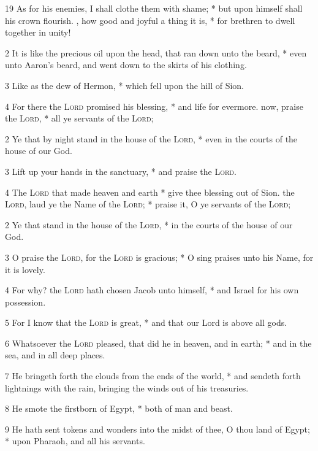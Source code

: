 19 As for his enemies, I shall clothe them with shame; * but upon himself shall his crown flourish.
, how good and joyful a thing it is, * for brethren to dwell together in unity!\par
2 It is like the precious oil upon the head, that ran down unto the beard, * even unto Aaron's beard, and went down to the skirts of his clothing.\par
3 Like as the dew of Hermon, * which fell upon the hill of Sion.\par
4 For there the {\textsc{Lord}} promised his blessing, * and life for evermore.
 now, praise the {\textsc{Lord}}, * all ye servants of the {\textsc{Lord}};\par
2 Ye that by night stand in the house of the {\textsc{Lord}}, * even in the courts of the house of our God.\par
3 Lift up your hands in the sanctuary, * and praise the {\textsc{Lord}}.\par
4 The {\textsc{Lord}} that made heaven and earth * give thee blessing out of Sion.
 the {\textsc{Lord}}, laud ye the Name of the {\textsc{Lord}}; * praise it, O ye servants of the {\textsc{Lord}};\par
2 Ye that stand in the house of the {\textsc{Lord}}, * in the courts of the house of our God.\par
3 O praise the {\textsc{Lord}}, for the {\textsc{Lord}} is gracious; * O sing praises unto his Name, for it is lovely.\par
4 For why? the {\textsc{Lord}} hath chosen Jacob unto himself, * and Israel for his own possession.\par
5 For I know that the {\textsc{Lord}} is great, * and that our Lord is above all gods.\par
6 Whatsoever the {\textsc{Lord}} pleased, that did he in heaven, and in earth; * and in the sea, and in all deep places.\par
7 He bringeth forth the clouds from the ends of the world, * and sendeth forth lightnings with the rain, bringing the winds out of his treasuries.\par
8 He smote the firstborn of Egypt, * both of man and beast.\par
9 He hath sent tokens and wonders into the midst of thee, O thou land of Egypt; * upon Pharaoh, and all his servants.\par
